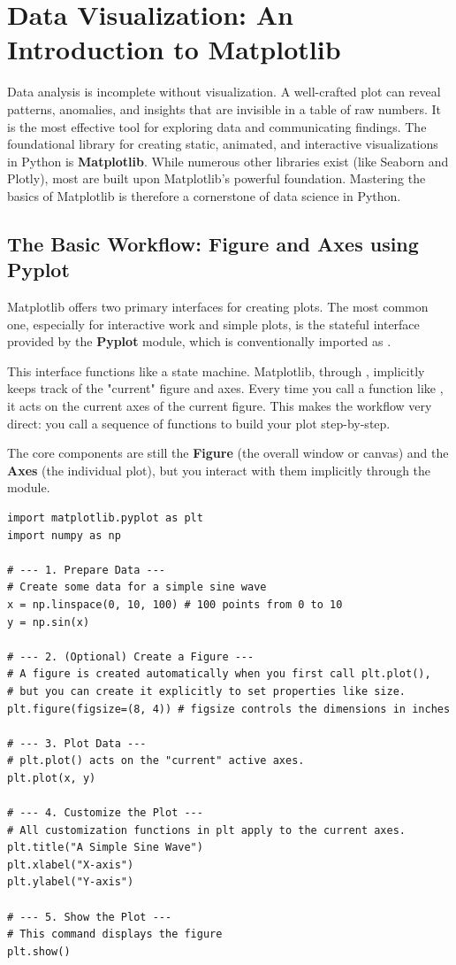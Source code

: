 \section{Data Visualization: An Introduction to Matplotlib}
\label{sec:matplotlib_intro}
Data analysis is incomplete without visualization. A well-crafted plot can reveal patterns, anomalies, and insights that are invisible in a table of raw numbers. It is the most effective tool for exploring data and communicating findings. The foundational library for creating static, animated, and interactive visualizations in Python is \textbf{Matplotlib}. While numerous other libraries exist (like Seaborn and Plotly), most are built upon Matplotlib's powerful foundation. Mastering the basics of Matplotlib is therefore a cornerstone of data science in Python.

\subsection{The Basic Workflow: Figure and Axes using Pyplot}
\label{subsec:matplotlib_workflow}
Matplotlib offers two primary interfaces for creating plots. The most common one, especially for interactive work and simple plots, is the stateful interface provided by the \textbf{Pyplot} module, which is conventionally imported as .

This interface functions like a state machine. Matplotlib, through , implicitly keeps track of the "current" figure and axes. Every time you call a function like , it acts on the current axes of the current figure. This makes the workflow very direct: you call a sequence of  functions to build your plot step-by-step.

The core components are still the \textbf{Figure} (the overall window or canvas) and the \textbf{Axes} (the individual plot), but you interact with them implicitly through the  module.

\begin{example}
\text{ }\begin{verbatim}
import matplotlib.pyplot as plt
import numpy as np

# --- 1. Prepare Data ---
# Create some data for a simple sine wave
x = np.linspace(0, 10, 100) # 100 points from 0 to 10
y = np.sin(x)

# --- 2. (Optional) Create a Figure ---
# A figure is created automatically when you first call plt.plot(),
# but you can create it explicitly to set properties like size.
plt.figure(figsize=(8, 4)) # figsize controls the dimensions in inches

# --- 3. Plot Data ---
# plt.plot() acts on the "current" active axes.
plt.plot(x, y)

# --- 4. Customize the Plot ---
# All customization functions in plt apply to the current axes.
plt.title("A Simple Sine Wave")
plt.xlabel("X-axis")
plt.ylabel("Y-axis")

# --- 5. Show the Plot ---
# This command displays the figure
plt.show()
\end{verbatim}
\end{example}

